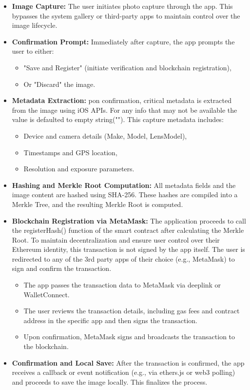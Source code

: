 \begin{itemize}
    \item {\textbf{Image Capture:}} The user initiates photo capture through the app. This bypasses the system gallery or third-party apps to maintain control over the image lifecycle.
    
    \item {\textbf{Confirmation Prompt:}} Immediately after capture, the app prompts the user to either:
    \begin{itemize}
        \item "Save and Register" (initiate verification and blockchain registration),
        \item Or "Discard" the image.
    \end{itemize}

    \item {\textbf{Metadata Extraction:}} pon confirmation, critical metadata is extracted from the image using iOS APIs. For any info that may not be available the value is defaulted to empty string(""). This capture metadata includes:
    \begin{itemize}
        \item Device and camera details (Make, Model, LensModel),
        \item Timestamps and GPS location,
        \item Resolution and exposure parameters.
    \end{itemize}

    \item {\textbf{Hashing and Merkle Root Computation:}} All metadata fields and the image content are hashed using SHA-256. These hashes are compiled into a Merkle Tree, and the resulting Merkle Root is computed.
    
    \item {\textbf{Blockchain Registration via MetaMask:}} 
    The application proceeds to call the registerHash() function of the smart contract after calculating the Merkle Root. 
    To maintain decentralization and ensure user control over their Ethereum identity, this transaction is not signed by the app itself. 
    The user is redirected to any of the 3rd party apps of their choice (e.g., MetaMask) to sign and confirm the transaction.
    \begin{itemize}
        \item The app passes the transaction data to MetaMask via deeplink or WalletConnect.
        \item The user reviews the transaction details, including gas fees and contract address in the specific app and then signs the transaction.
        \item Upon confirmation, MetaMask signs and broadcasts the transaction to the blockchain.
    \end{itemize}

    \item {\textbf{Confirmation and Local Save:}} After the transaction is confirmed, the app receives a callback or event notification (e.g., via ethers.js or web3 polling) and proceeds to save the image locally. This finalizes the process. 
\end{itemize}

